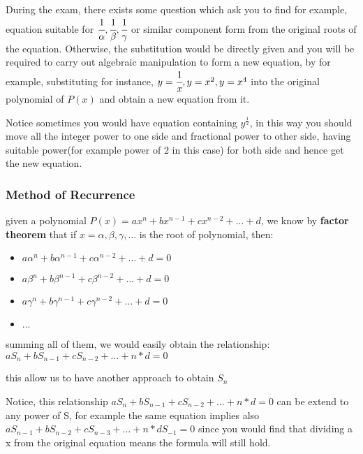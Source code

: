 \documentclass[]{article}
\begin{document}
During the exam, there exists some question which ask you to find for
example, equation suitable for
\(\cfrac{1}{\alpha},\cfrac{1}{\beta},\cfrac{1}{\gamma}\) or similar
component form from the original roots of the equation. Otherwise, the
substitution would be directly given and you will be required to carry
out algebraic manipulation to form a new equation, by for example,
substituting for instance, \(y = \cfrac{1}{x}, y = x^2,  y = x^4\) into
the original polynomial of \(P(x)\) and obtain a new equation from it.

Notice sometimes you would have equation containing \(y^\frac{1}{2}\),
in this way you should move all the integer power to one side and
fractional power to other side, having suitable power(for example power
of 2 in this case) for both side and hence get the new equation.

\subsubsection{Method of Recurrence}\label{header-n258}

given a polynomial \(P(x) = ax^n + bx^{n-1} + cx^{n-2} + \dots + d\), we
know by \textbf{factor theorem} that if
\(x = \alpha,\beta,\gamma,\dots\) is the root of polynomial, then:

\begin{itemize}
\item
  \(a\alpha^n + b\alpha^{n-1} + c\alpha^{n-2} + \dots + d = 0\)
\item
  \(a\beta^n + b\beta^{n-1} + c\beta^{n-2} + \dots + d = 0\)
\item
  \(a\gamma^n + b\gamma^{n-1} + c\gamma^{n-2} + \dots + d = 0\)
\item
  \(\dots\)
\end{itemize}

summing all of them, we would easily obtain the relationship:
\(aS_n + bS_{n-1} + cS_{n-2} + \dots + n*d = 0\)

this allow us to have another approach to obtain \(S_n\)

Notice, this relationship
\(aS_n + bS_{n-1} + cS_{n-2} + \dots + n*d = 0\) can be extend to any
power of S, for example the same equation implies also
\(aS_{n-1} + bS_{n-2} + cS_{n-3} + \dots + n*dS_{-1} = 0\) since you
would find that dividing a x from the original equation means the
formula will still hold.
\end{document}
